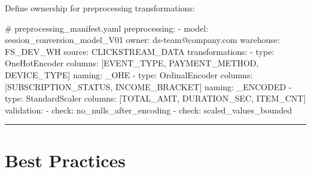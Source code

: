 \documentclass[
  letterpaper,
  DIV=11,
  numbers=noendperiod]{scrreprt}
\newenvironment{Shaded}{\begin{snugshade}}{\end{snugshade}}
\newcommand{\AttributeTok}[1]{\textcolor[rgb]{0.40,0.45,0.13}{#1}}
\newcommand{\CommentTok}[1]{\textcolor[rgb]{0.37,0.37,0.37}{#1}}
\newcommand{\FunctionTok}[1]{\textcolor[rgb]{0.28,0.35,0.67}{#1}}
\newcommand{\KeywordTok}[1]{\textcolor[rgb]{0.00,0.23,0.31}{#1}}
\begin{document}
Define ownership for preprocessing transformations:

\begin{Shaded}
\begin{Highlighting}[]
\CommentTok{\# preprocessing\_manifest.yaml}
\FunctionTok{preprocessing}\KeywordTok{:}
\AttributeTok{  }\KeywordTok{{-}}\AttributeTok{ }\FunctionTok{model}\KeywordTok{:}\AttributeTok{ session\_conversion\_model\_V01}
\AttributeTok{    }\FunctionTok{owner}\KeywordTok{:}\AttributeTok{ ds{-}team@company.com}
\AttributeTok{    }\FunctionTok{warehouse}\KeywordTok{:}\AttributeTok{ FS\_DEV\_WH}
\AttributeTok{    }\FunctionTok{source}\KeywordTok{:}\AttributeTok{ CLICKSTREAM\_DATA}
\AttributeTok{    }\FunctionTok{transformations}\KeywordTok{:}
\AttributeTok{      }\KeywordTok{{-}}\AttributeTok{ }\FunctionTok{type}\KeywordTok{:}\AttributeTok{ OneHotEncoder}
\AttributeTok{        }\FunctionTok{columns}\KeywordTok{:}\AttributeTok{ }\KeywordTok{[}\AttributeTok{EVENT\_TYPE}\KeywordTok{,}\AttributeTok{ PAYMENT\_METHOD}\KeywordTok{,}\AttributeTok{ DEVICE\_TYPE}\KeywordTok{]}
\AttributeTok{        }\FunctionTok{naming}\KeywordTok{:}\AttributeTok{ \_OHE}
\AttributeTok{      }\KeywordTok{{-}}\AttributeTok{ }\FunctionTok{type}\KeywordTok{:}\AttributeTok{ OrdinalEncoder}
\AttributeTok{        }\FunctionTok{columns}\KeywordTok{:}\AttributeTok{ }\KeywordTok{[}\AttributeTok{SUBSCRIPTION\_STATUS}\KeywordTok{,}\AttributeTok{ INCOME\_BRACKET}\KeywordTok{]}
\AttributeTok{        }\FunctionTok{naming}\KeywordTok{:}\AttributeTok{ \_ENCODED}
\AttributeTok{      }\KeywordTok{{-}}\AttributeTok{ }\FunctionTok{type}\KeywordTok{:}\AttributeTok{ StandardScaler}
\AttributeTok{        }\FunctionTok{columns}\KeywordTok{:}\AttributeTok{ }\KeywordTok{[}\AttributeTok{TOTAL\_AMT}\KeywordTok{,}\AttributeTok{ DURATION\_SEC}\KeywordTok{,}\AttributeTok{ ITEM\_CNT}\KeywordTok{]}
\AttributeTok{    }\FunctionTok{validation}\KeywordTok{:}
\AttributeTok{      }\KeywordTok{{-}}\AttributeTok{ }\FunctionTok{check}\KeywordTok{:}\AttributeTok{ no\_nulls\_after\_encoding}
\AttributeTok{      }\KeywordTok{{-}}\AttributeTok{ }\FunctionTok{check}\KeywordTok{:}\AttributeTok{ scaled\_values\_bounded}
\end{Highlighting}
\end{Shaded}

\begin{center}\rule{0.5\linewidth}{0.5pt}\end{center}

\hypertarget{best-practices-7}{%
\section{Best Practices}\label{best-practices-7}}
\end{document}
